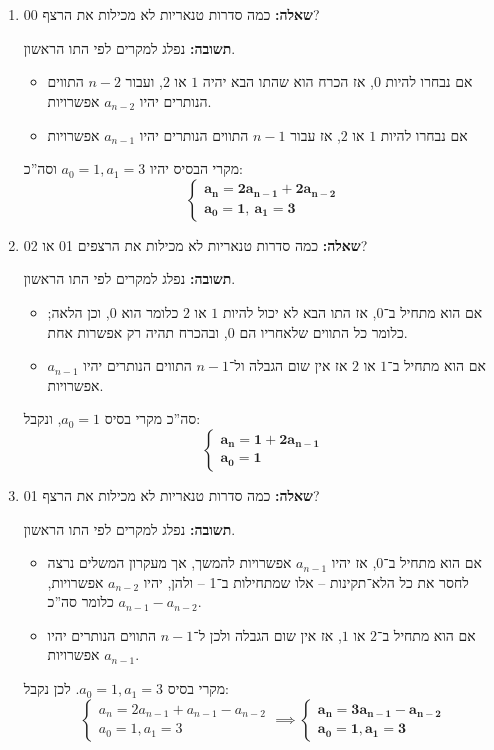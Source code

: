 \documentclass[]{article}
\begin{document}
	\section{} %
	\begin{enumerate}
		\item \textbf{שאלה: }כמה סדרות טנאריות לא מכילות את הרצף 00?
		
		\textbf{תשובה: }נפלג למקרים לפי התו הראשון. 
		\begin{itemize}
			\item אם נבחרו להיות $0$, אז הכרח הוא שהתו הבא יהיה $1$ או $2$, ועבור $n - 2$ התווים הנותרים יהיו $a_{n - 2}$ אפשרויות. 
			\item אם נבחרו להיות $1$ או $2$, אז עבור $n - 1$ התווים הנותרים יהיו $a_{n - 1}$ אפשרויות
		\end{itemize}
		מקרי הבסיס יהיו $a_0 = 1, a_1 = 3 $ וסה''כ: 
		\[ \begin{cases}
			\bm{a_n = 2a_{n - 1} + 2a_{n - 2}} \\
			\bm{a_0 = 1, \ a_1 = 3}
		\end{cases} \]
		\item \textbf{שאלה: }כמה סדרות טנאריות לא מכילות את הרצפים 01 או 02?
		
		\textbf{תשובה: }נפלג למקרים לפי התו הראשון.
		\begin{itemize}
			\item אם הוא מתחיל ב־$0$, אז התו הבא לא יכול להיות $1$ או $2$ כלומר הוא $0$, וכן הלאה; כלומר כל התווים שלאחריו הם $0$, ובהכרח תהיה רק אפשרות אחת. 
			\item אם הוא מתחיל ב־$1$ או $2$ אז אין שום הגבלה ו‏ל־$n - 1$ התווים הנותרים יהיו $a_{n - 1}$ אפשרויות. 
		\end{itemize}
		סה''כ מקרי בסיס $a_0 = 1 $, ונקבל: 
		\[ \begin{cases}
			\bm{a_n = 1 + 2a_{n - 1}} \\
			\bm{a_0 = 1}
		\end{cases} \]
		
		\item \textbf{שאלה: }כמה סדרות טנאריות לא מכילות את הרצף 01?
		
		\textbf{תשובה: }נפלג למקרים לפי התו הראשון. 
		\begin{itemize}
			\item אם הוא מתחיל ב־$0$, אז יהיו $a_{n - 1}$ אפשרויות להמשך, אך מעקרון המשלים נרצה לחסר את כל הלא־תקינות – אלו שמתחילות ב־1 – ולהן, יהיו $a_{n - 2}$ אפשרויות, כלומר סה''כ $a_{n - 1} - a_{n - 2}$. 
			\item אם הוא מתחיל ב־$2$ או $1$, אז אין שום הגבלה ולכן ל־$n - 1$ התווים הנותרים יהיו $a_{n - 1}$ אפשרויות. 
		\end{itemize}
		מקרי בסיס $a_0 = 1, a_1 = 3 $. לכן נקבל: 
		\[ \begin{cases}
			a_n = 2a_{n - 1} + a_{n - 1} - a_{n - 2}\\
			a_0 = 1, a_1 = 3
		\end{cases} \implies \begin{cases}
			\bm{a_n = 3a_{n - 1} - a_{n - 2}} \\
			\bm{a_0 = 1, a_1 = 3}
		\end{cases} \]
		
	\end{enumerate}
\end{document}
